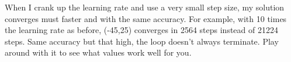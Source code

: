 \documentclass[titlepage]{tufte-book}
\begin{document}
\begin{fullwidth}
\noindent {}

\noindent {}

When I crank up the learning rate and use a very small step size, my solution converges must faster and with the same accuracy. For example, with 10 times the learning rate as before, (-45,25) converges in 2564 steps instead of 21224 steps. Same accuracy but that high, the loop doesn't always terminate. Play around with it to see what values work well for you.


\end{fullwidth}
\end{document}
